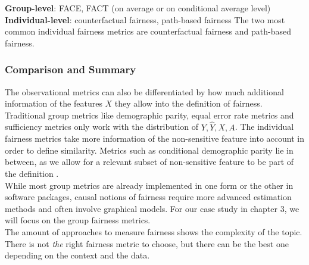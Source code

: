 \textbf{Group-level}: FACE, FACT (on average or on conditional average level) \parencite{Zafar2017PPNFC}\\
\textbf{Individual-level}: counterfactual fairness, path-based fairness \parencite{kusner} 
The two most common individual fairness metrics are counterfactual fairness and path-based fairness.


\subsubsection*{Comparison and Summary}

The observational metrics can also be differentiated by how much additional information of the features $X$ they allow into the definition of fairness.
Traditional group metrics like demographic parity, equal error rate metrics and sufficiency metrics only work with the distribution of $Y, \hat{Y}, X, A$. The individual fairness metrics take more information of the non-sensitive feature into account in order to define similarity. Metrics such as conditional demographic parity lie in between, as we allow for a relevant subset of non-sensitive feature to be part of the definition \cite{castelnovo2022}.\\
While most group metrics are already implemented in one form or the other in software packages, causal notions of fairness require more advanced estimation methods and often involve graphical models. For our case study in chapter 3, we will focus on the group fairness metrics.\\
The amount of approaches to measure fairness shows the complexity of the topic. There is not \textit{the} right fairness metric to choose, but there can be the best one depending on the context and the data.



